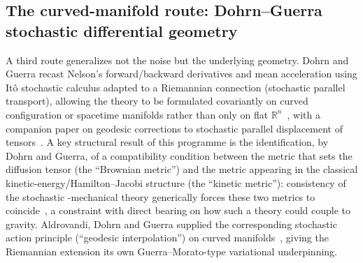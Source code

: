 \documentclass[11pt]{article}
\newcommand{\R}{\mathbb{R}}
\begin{document}
\subsection{The curved-manifold route: Dohrn--Guerra stochastic differential geometry}

A third route generalizes not the noise but the underlying geometry. Dohrn
and Guerra recast Nelson's forward/backward derivatives and mean
acceleration using It\^o stochastic calculus adapted to a Riemannian
connection (stochastic parallel transport), allowing the theory to be
formulated covariantly on curved configuration or spacetime manifolds
rather than only on flat $\R^n$~\cite{dohrnguerra78}, with a companion
paper on geodesic corrections to stochastic parallel displacement of
tensors~\cite{dohrnguerra79b}. A key structural result of this programme 
is the identification, by Dohrn and Guerra, of a compatibility condition
between the metric that sets the diffusion tensor (the ``Brownian metric'')
and the metric appearing in the classical kinetic-energy/Hamilton--Jacobi
structure (the ``kinetic metric''): consistency of the stochastic
-mechanical theory generically forces these two metrics to
coincide~\cite{dohrnguerra85}, a constraint with direct bearing on how such
a theory could couple to gravity. Aldrovandi, Dohrn and Guerra supplied the
corresponding stochastic action principle (``geodesic interpolation'') on
curved manifolds~\cite{aldrovandi90,aldrovandi92}, giving the Riemannian
extension its own Guerra--Morato-type variational underpinning.
\end{document}
